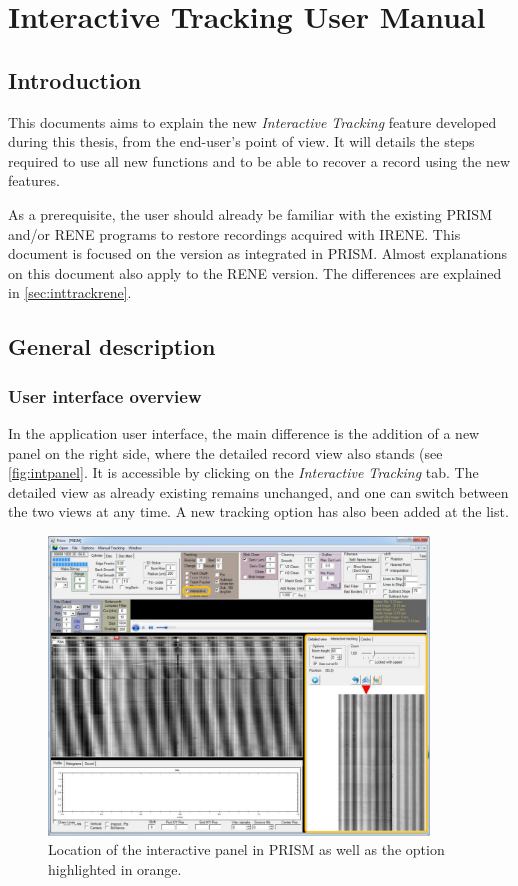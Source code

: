 
\chapter{Interactive Tracking User Manual}
\label{chap:usermanint}

\section{Introduction}

This documents aims to explain the new \emph{Interactive Tracking} feature developed during this thesis, from the end-user's point of view. It will details the steps required to use all new functions and to be able to recover a record using the new features.

As a prerequisite, the user should already be familiar with the existing PRISM and/or RENE programs to restore recordings acquired with IRENE. This document is focused on the version as integrated in PRISM. Almost explanations on this document also apply to the RENE version. The differences are explained in \autoref{sec:inttrackrene}.

\section{General description}

\subsection{User interface overview}

In the application user interface, the main difference is the addition of a new panel on the right side, where the detailed record view also stands (see \autoref{fig:intpanel}. It is accessible by clicking on the \emph{Interactive Tracking} tab. The detailed view as already existing remains unchanged, and one can switch between the two views at any time. A new tracking option has also been added at the list.

\begin{figure}[!ht]
\centering
\includegraphics[width=0.9\textwidth]{images/int-right-panel}
\caption[Location of the interactive panel in PRISM.]
{Location of the interactive panel in PRISM as well as the option highlighted in orange.}
\label{fig:intpanel}
\end{figure}

